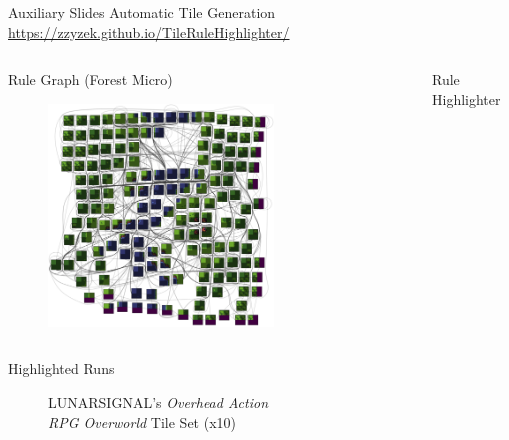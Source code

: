 \documentclass{beamer}
\begin{document}
  \appendix

  \begin{frame}[fragile]{Auxiliary Slides}
    Automatic Tile Generation \\
    \url{https://zzyzek.github.io/TileRuleHighlighter/}
    \begin{columns}[T,onlytextwidth]
        \begin{block}{Rule Graph (Forest Micro)}
          \begin{figure}
            \includegraphics[width=0.7\textwidth]{img/forestmicro_rule_grid_tb.pdf}
          \end{figure}
        \end{block}
        \begin{block}{Rule Highlighter}
          \begin{figure}
          \end{figure}
        \end{block}
    \end{columns}

  \end{frame}


  \begin{frame}[fragile]{Highlighted Runs}
    \begin{figure}
      LUNARSIGNAL's \textit{Overhead Action} \\ \textit{RPG Overworld} Tile Set (x10)
    \end{figure}
  \end{frame}
\end{document}
